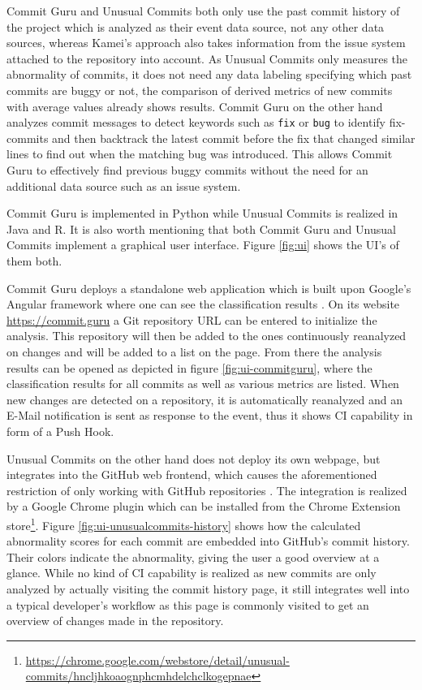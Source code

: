 Commit Guru and Unusual Commits both only use the past commit history of the project which is analyzed as their event data source, not any other data sources, whereas Kamei's approach also takes information from the issue system attached to the repository into account.
As Unusual Commits only measures the abnormality of commits, it does not need any data labeling specifying which past commits are buggy or not, the comparison of derived metrics of new commits with average values already shows results.
Commit Guru on the other hand analyzes commit messages to detect keywords such as \texttt{fix} or \texttt{bug} to identify fix-commits and then backtrack the latest commit before the fix that changed similar lines to find out when the matching bug was introduced. This allows Commit Guru to effectively find previous buggy commits without the need for an additional data source such as an issue system.

Commit Guru is implemented in Python while Unusual Commits is realized in Java and R. It is also worth mentioning that both Commit Guru and Unusual Commits implement a graphical user interface. 
Figure \ref{fig:ui} shows the UI's of them both. 

Commit Guru deploys a standalone web application which is built upon Google's Angular framework where one can see the classification results \cite{Rosen2015}. On its website \url{https://commit.guru} a Git repository URL can be entered to initialize the analysis. This repository will then be added to the ones continuously reanalyzed on changes and will be added to a list on the page. From there the analysis results can be opened as depicted in figure \ref{fig:ui-commitguru}, where the classification results for all commits as well as various metrics are listed. When new changes are detected on a repository, it is automatically reanalyzed and an E-Mail notification is sent as response to the event, thus it shows CI capability in form of a Push Hook.

Unusual Commits on the other hand does not deploy its own webpage, but integrates into the GitHub web frontend, which causes the aforementioned restriction of only working with GitHub repositories \cite{Goyal2017}. The integration is realized by a Google Chrome plugin which can be installed from the Chrome Extension store\footnote{\url{https://chrome.google.com/webstore/detail/unusual-commits/hncljhkoaognphcmhdelchclkogepnae}}. Figure \ref{fig:ui-unusualcommits-history} shows how the calculated abnormality scores for each commit are embedded into GitHub's commit history. Their colors indicate the abnormality, giving the user a good overview at a glance. While no kind of CI capability is realized as new commits are only analyzed by actually visiting the commit history page, it still integrates well into a typical developer's workflow as this page is commonly visited to get an overview of changes made in the repository. 

